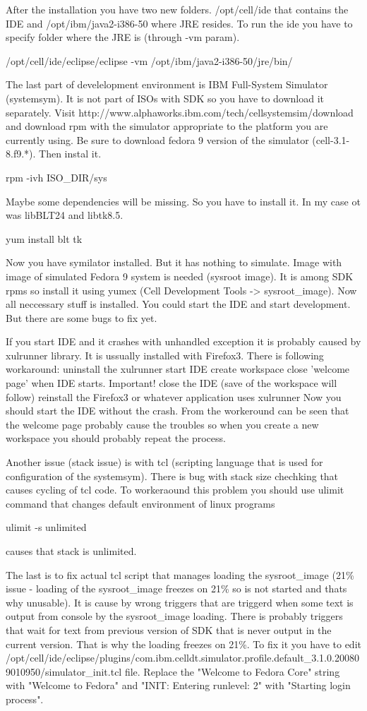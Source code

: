 \documentclass{article}
\begin{document}
After the installation you have two new folders. /opt/cell/ide that contains the IDE and /opt/ibm/java2-i386-50 where JRE resides. To run the ide you have to specify folder where the JRE is (through -vm param).

/opt/cell/ide/eclipse/eclipse -vm /opt/ibm/java2-i386-50/jre/bin/

The last part of develelopment environment is IBM Full-System Simulator (systemsym). It is not part of ISOs with SDK so you have to download it separately. Visit http://www.alphaworks.ibm.com/tech/cellsystemsim/download and download rpm with the simulator appropriate to the platform you are currently using. Be sure to download fedora 9 version of the simulator (cell-3.1-8.f9.*). Then instal it.

rpm -ivh ISO_DIR/sys

Maybe some dependencies will be missing. So you have to install it. In my case ot was libBLT24 and libtk8.5.

yum install blt tk

Now you have symilator installed. But it has nothing to simulate. Image with image of simulated Fedora 9 system is needed (sysroot image). It is among SDK rpms so install it using yumex (Cell Development Tools -> sysroot_image).
Now all neccessary stuff is installed. You could start the IDE and start development. But there are some bugs to fix yet. 

If you start IDE and it crashes with unhandled exception it is probably caused by xulrunner library. It is ussually installed with Firefox3. There is following workaround:
uninstall the xulrunner
start IDE
create workspace
close 'welcome page' when IDE starts. Important!
close the IDE (save of the workspace will follow)
reinstall the Firefox3 or whatever application uses xulrunner
Now you should start the IDE without the crash. From the workeround can be seen that the welcome page probably cause the troubles so when you create a new workspace you should probably repeat the process.

Another issue (stack issue) is with tcl (scripting language that is used for configuration of the systemsym). There is bug with stack size chechking that causes cycling of tcl code. To workeraound this problem you should use ulimit command that changes default environment of linux programs

ulimit -s unlimited

causes that stack is unlimited.

The last is to fix actual tcl script that manages loading the sysroot_image (21\% issue - loading of the sysroot_image freezes on 21\% so is not started and thats why unusable). It is cause by wrong triggers that are triggerd when some text is output from console by the sysroot_image loading. There is probably triggers that wait for text from previous version of SDK that is never output in the current version. That is why the loading freezes on 21\%. To fix it you have to edit /opt/cell/ide/eclipse/plugins/com.ibm.celldt.simulator.profile.default_3.1.0.200809010950/simulator_init.tcl file. Replace the "Welcome to Fedora Core" string with "Welcome to Fedora" and "INIT: Entering runlevel: 2" with "Starting login process".
\end{document}
